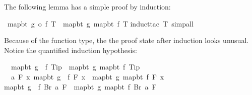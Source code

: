 \begin{isabellebody}
\begin{isamarkuptext}
The following lemma has a simple proof by induction:%
\end{isamarkuptext}%
\isamarkuptrue%
\ {\isachardoublequote}map{\isacharunderscore}bt\ {\isacharparenleft}g\ o\ f{\isacharparenright}\ T\ {\isacharequal}\ map{\isacharunderscore}bt\ g\ {\isacharparenleft}map{\isacharunderscore}bt\ f\ T{\isacharparenright}{\isachardoublequote}\isanewline
\isamarkupfalse%
induct{\isacharunderscore}tac\ T{\isacharcomma}\ simp{\isacharunderscore}all{\isacharparenright}\isanewline
\isamarkupfalse%
\isamarkupfalse%
\isamarkupfalse%
\isamarkupfalse%
%
\begin{isamarkuptxt}%
\noindent
Because of the function type, the 
the proof state after induction looks unusual.
Notice the quantified induction hypothesis:
\begin{isabelle}%
\ {}{\isachardot}\ map{\isacharunderscore}bt\ {\isacharparenleft}g\ {\isasymcirc}\ f{\isacharparenright}\ Tip\ {\isacharequal}\ map{\isacharunderscore}bt\ g\ {\isacharparenleft}map{\isacharunderscore}bt\ f\ Tip{\isacharparenright}\isanewline
\ {}{\isachardot}\ {\isasymAnd}a\ F{\isachardot}\ {\isacharparenleft}{\isasymAnd}x{\isachardot}\ map{\isacharunderscore}bt\ {\isacharparenleft}g\ {\isasymcirc}\ f{\isacharparenright}\ {\isacharparenleft}F\ x{\isacharparenright}\ {\isacharequal}\ map{\isacharunderscore}bt\ g\ {\isacharparenleft}map{\isacharunderscore}bt\ f\ {\isacharparenleft}F\ x{\isacharparenright}{\isacharparenright}{\isacharparenright}\ {\isasymLongrightarrow}\isanewline
{}map{\isacharunderscore}bt\ {\isacharparenleft}g\ {\isasymcirc}\ f{\isacharparenright}\ {\isacharparenleft}Br\ a\ F{\isacharparenright}\ {\isacharequal}\ map{\isacharunderscore}bt\ g\ {\isacharparenleft}map{\isacharunderscore}bt\ f\ {\isacharparenleft}Br\ a\ F{\isacharparenright}{\isacharparenright}%
\end{isabelle}%
\end{isamarkuptxt}%
\isamarkuptrue%
\isamarkupfalse%
\isamarkupfalse%
\end{isabellebody}%
